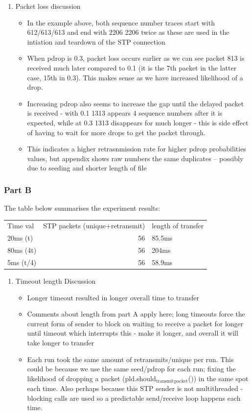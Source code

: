 \documentclass[11pt]{article}
\begin{document}
\begin{enumerate}
\item Packet loss discussion
\label{sec:org7a0ba7f}
\begin{itemize}
\item In the example above, both sequence number traces start with 612/613/613 and end with 2206 2206 twice as these are used in the intiation and teardown of the STP connection
\item When pdrop is 0.3, packet loss occurs earlier as we can see packet 813 is received much later compared to 0.1 (it is the 7th packet in the latter case, 15th in 0.3). This makes sense as we have increased likelihood of a drop.
\item Increasing pdrop also seems to increase the gap until the delayed packet is received - with 0.1 1313 appears 4 sequence numbers after it is expected, while at 0.3 1313 disappears for much longer - this is side effect of having to wait for more drops to get the packet through.
\item This indicates a higher retrasnmission rate for higher pdrop probabilities values, but appendix shows raw numbers the same duplicates -- possibly due to seeding and shorter length of file
\end{itemize}
\end{enumerate}
\subsubsection{Part B}
\label{sec:orgd504658}
The table below summarises the experiment results:
\begin{center}
\begin{tabular}{lrl}
Time val & STP packets (unique+retransmit) & length of transfer\\
20ms (t) & 56 & 85.5ms\\
80ms (4t) & 56 & 204ms\\
5ms (t/4) & 56 & 58.9ms\\
\end{tabular}
\end{center}

\begin{enumerate}
\item Timeout length Discussion
\label{sec:org6d543f7}
\begin{itemize}
\item Longer timeout resulted in longer overall time to transfer
\item Comments about length from part A apply here; long timeouts force the current form of sender to block on waiting to receive a packet for longer until timeout which interrupts this - make it longer, and overall it will take longer to transfer
\item Each run took the same amount of retransmits/unique per run. This could be because we use the same seed/pdrop for each run; fixing the likelihood of dropping a packet (pld.should\(_{\text{transmit}}\)\(_{\text{packet}}\)()) in the same spot each time.  Also perhaps because this STP sender is not multithreaded - blocking calls are used so a predictable send/receive loop happens each time.
\end{itemize}
\end{enumerate}
\end{document}
